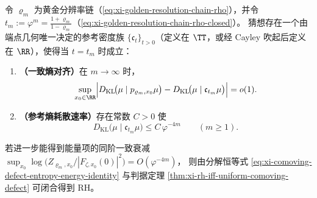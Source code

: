 \begin{conjecture}[黄金尺度下的熵刚性与端点基准流]\label{conj:xi-horizon-entropy-rigidity-golden-reference}
令 \(\varrho_m\) 为黄金分辨率链（\eqref{eq:xi-golden-resolution-chain-rho}），并令 \(t_m:=\varphi^m=\frac{1+\varrho_m}{1-\varrho_m}\)（\eqref{eq:xi-golden-resolution-chain-rho-closed}）。
猜想存在一个由端点几何唯一决定的参考密度族 \(\{\mathfrak{c}_t\}_{t>0}\)（定义在 \(\TT\)，或经 Cayley 吹起后定义在 \(\RR\)），使得当 \(t=t_m\) 时成立：
\begin{enumerate}
  \item \textbf{（一致熵对齐）}在 \(m\to\infty\) 时，
  \[
  \sup_{x_0\in\RR}\Bigl|D_{\mathrm{KL}}\!\bigl(\mu\mid p_{\varrho_m,x_0}\mu\bigr)-D_{\mathrm{KL}}\!\bigl(\mu\mid \mathfrak{c}_{t_m}\mu\bigr)\Bigr|
  =o(1).
  \]
  \item \textbf{（参考熵耗散速率）}存在常数 \(C>0\) 使
  \[
  D_{\mathrm{KL}}\!\bigl(\mu\mid \mathfrak{c}_{t_m}\mu\bigr)\le C\,\varphi^{-4m}\qquad(m\ge 1).
  \]
\end{enumerate}
若进一步能得到能量项的同阶一致衰减
\(
\sup_{x_0}\log\!\bigl(Z_{\varrho_m,x_0}/|F_{\zeta,x_0}(0)|^2\bigr)=O(\varphi^{-4m})
\)，
则由分解恒等式 \eqref{eq:xi-comoving-defect-entropy-energy-identity} 与判据定理 \ref{thm:xi-rh-iff-uniform-comoving-defect} 可闭合得到 RH。
\end{conjecture}

\endinput


